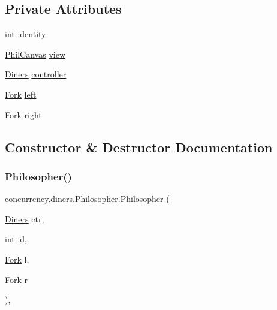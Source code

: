 \subsection*{Private Attributes}
\begin{DoxyCompactItemize}
\item 
int \mbox{\hyperlink{classconcurrency_1_1diners_1_1_philosopher_a857d8882220e7e07a789a77cac3a6975}{identity}}
\item 
\mbox{\hyperlink{classconcurrency_1_1diners_1_1_phil_canvas}{Phil\+Canvas}} \mbox{\hyperlink{classconcurrency_1_1diners_1_1_philosopher_a2199286e6b640f1398de1b2eeeedf478}{view}}
\item 
\mbox{\hyperlink{classconcurrency_1_1diners_1_1_diners}{Diners}} \mbox{\hyperlink{classconcurrency_1_1diners_1_1_philosopher_a92157e1742f905b5fde4f58437d8c41f}{controller}}
\item 
\mbox{\hyperlink{classconcurrency_1_1diners_1_1_fork}{Fork}} \mbox{\hyperlink{classconcurrency_1_1diners_1_1_philosopher_ab7a3ed11b232741170a3e2b3cd2b76ce}{left}}
\item 
\mbox{\hyperlink{classconcurrency_1_1diners_1_1_fork}{Fork}} \mbox{\hyperlink{classconcurrency_1_1diners_1_1_philosopher_ac9c6e05b2b2b0d9d78c68cb2e51b96f7}{right}}
\end{DoxyCompactItemize}


\subsection{Constructor \& Destructor Documentation}
\mbox{\label{classconcurrency_1_1diners_1_1_philosopher_a79f885d27cffb8c3bf00ecd084fe5357}} 
\subsubsection{\texorpdfstring{Philosopher()}{Philosopher()}}
{\footnotesize\ttfamily concurrency.\+diners.\+Philosopher.\+Philosopher (\begin{DoxyParamCaption}\item[{\mbox{\hyperlink{classconcurrency_1_1diners_1_1_diners}{Diners}}}]{ctr,  }\item[{int}]{id,  }\item[{\mbox{\hyperlink{classconcurrency_1_1diners_1_1_fork}{Fork}}}]{l,  }\item[{\mbox{\hyperlink{classconcurrency_1_1diners_1_1_fork}{Fork}}}]{r }\end{DoxyParamCaption})\hspace{0.3cm}{\ttfamily [inline]}, {\ttfamily [package]}}


